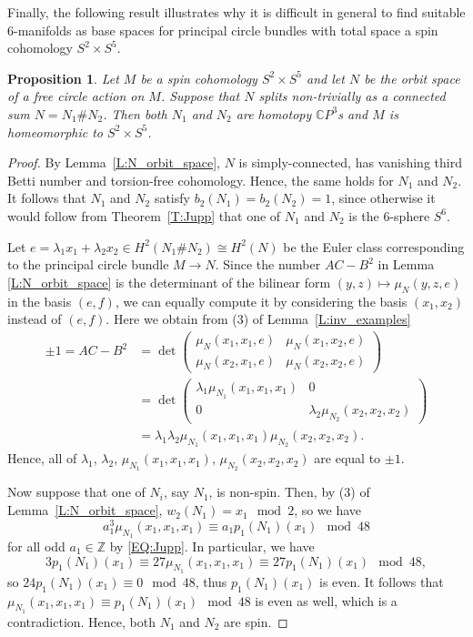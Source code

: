 \documentclass[pdftex]{sigma}
\numberwithin{equation}{section}
\newtheorem{Proposition}[Theorem]{Proposition}
\theoremstyle{definition}
\numberwithin{table}{section}
\newcommand{\Z}{\mathbb{Z}}
\newcommand{\C}{\mathbb{C}}
\begin{document}
Finally, the following result illustrates why it is difficult in general to find suitable $6$-manifolds as base spaces for principal circle bundles with total space a spin cohomology $S^2\times S^5$.
\begin{Proposition}
	Let $M$ be a spin cohomology $S^2\times S^5$ and let $N$ be the orbit space of a free circle action on $M$. Suppose that $N$ splits non-trivially as a connected sum $N=N_1\# N_2$. Then both $N_1$ and $N_2$ are homotopy $\C P^3$s and $M$ is homeomorphic to $S^2\times S^5$.
\end{Proposition}
\begin{proof}
	By Lemma~\ref{L:N_orbit_space}, $N$ is simply-connected, has vanishing third Betti number and torsion-free cohomology. Hence, the same holds for $N_1$ and $N_2$. It follows that $N_1$ and $N_2$ satisfy $b_2(N_1)=b_2(N_2)=1$, since otherwise it would follow from Theorem~\ref{T:Jupp} that one of $N_1$ and $N_2$ is the $6$-sphere $S^6$.
	
	Let $e=\lambda_1 x_1+\lambda_2 x_2\in H^2(N_1\# N_2)\cong H^2(N)$ be the Euler class corresponding to the principal circle bundle $M\to N$. Since the number $AC-B^2$ in Lemma~ \ref{L:N_orbit_space} is the determinant of the bilinear form $(y,z)\mapsto \mu_N(y,z,e)$ in the basis $(e,f)$, we can equally compute it by considering the basis $(x_1,x_2)$ instead of $(e,f)$. Here we obtain from (3) of Lemma~\ref{L:inv_examples}
	\begin{align*}
		\pm 1=AC-B^2&=\det\begin{pmatrix}
			\mu_N(x_1,x_1,e) & \mu_N(x_1,x_2,e)\\
			\mu_N(x_2,x_1,e) & \mu_N(x_2,x_2,e)
		\end{pmatrix}\\
		&=\det\begin{pmatrix}
			\lambda_1 \mu_{N_1}(x_1,x_1,x_1) & 0\\
			0 & \lambda_2 \mu_{N_2}(x_2,x_2,x_2)
		\end{pmatrix}\\
		&=\lambda_1\lambda_2 \mu_{N_1}(x_1,x_1,x_1)\mu_{N_2}(x_2,x_2,x_2).
	\end{align*}
	Hence, all of $\lambda_1$, $\lambda_2$, $\mu_{N_1}(x_1,x_1,x_1)$, $\mu_{N_2}(x_2,x_2,x_2)$ are equal to $\pm1$.
	
	Now suppose that one of $N_i$, say $N_1$, is non-spin. Then, by (3) of Lemma~\ref{L:N_orbit_space}, $w_2(N_1)=x_1\mod 2$, so we have
	\[ a_1^3\mu_{N_1}(x_1,x_1,x_1)\equiv a_1 p_1(N_1)(x_1)\mod 48 \]
	for all odd $a_1\in\Z$ by \eqref{EQ:Jupp}. In particular, we have
	\[ 3p_1(N_1)(x_1)\equiv 27\mu_{N_1}(x_1,x_1,x_1)\equiv 27p_1(N_1)(x_1)\mod 48, \]
	so $24p_1(N_1)(x_1)\equiv 0\mod 48$, thus $p_1(N_1)(x_1)$ is even. It follows that $\mu_{N_1}(x_1,x_1,x_1)\equiv p_1(N_1)(x_1)\mod 48$ is even as well, which is a contradiction. Hence, both $N_1$ and $N_2$ are spin.
	

\end{proof}
\end{document}
